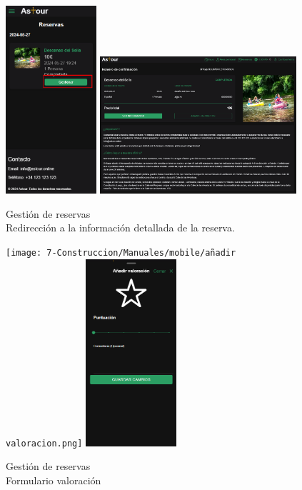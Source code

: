 \begin{figure}[H]
	\centering
	\begin{minipage}{0.45\textwidth}
		\centering
		\includegraphics[width=0.3\textwidth]{7-Construccion/Manuales/mobile/gestionar completada.png}
		\includegraphics[width=0.65\textwidth]{7-Construccion/Manuales/web/reserva detalles completada.png}
		\caption{Gestión de reservas \\ Redirección a la información detallada de la reserva.}
		\label{fig:detalles-reserva-completada}
	\end{minipage}
	\hfill
	\begin{minipage}{0.45\textwidth}
		\centering
		\texttt{[image: 7-Construccion/Manuales/mobile/añadir valoracion.png]}
		\includegraphics[width=0.3\textwidth]{7-Construccion/Manuales/mobile/formulario valoracion.png}
		\caption{Gestión de reservas \\ Formulario valoración}
		\label{fig:modal-valoracion}
	\end{minipage}
\end{figure}

